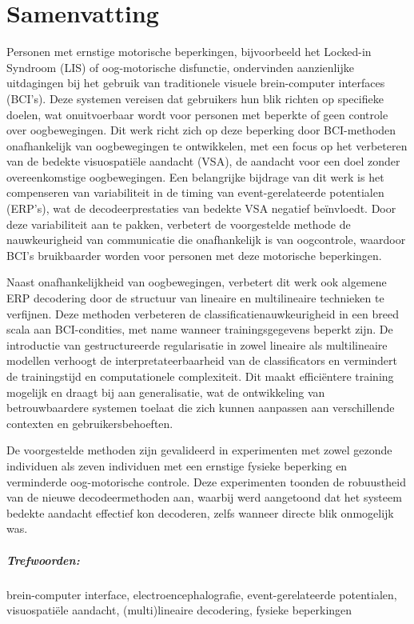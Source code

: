 \chapter*{Samenvatting}

Personen met ernstige motorische beperkingen, bijvoorbeeld het Locked-in
Syndroom (LIS) of oog-motorische disfunctie, ondervinden aanzienlijke
uitdagingen bij het gebruik van traditionele visuele brein-computer interfaces (BCI's).
Deze systemen vereisen dat gebruikers hun blik richten op specifieke doelen,
wat onuitvoerbaar wordt voor personen met beperkte of geen controle
over oogbewegingen.
Dit werk richt zich op deze beperking door BCI-methoden onafhankelijk van
oogbewegingen te ontwikkelen, met een focus op het verbeteren van de bedekte
visuospati\"ele aandacht (VSA), de  aandacht voor een doel zonder
overeenkomstige oogbewegingen.
Een belangrijke bijdrage van dit werk is het compenseren van variabiliteit in
de timing van event-gerelateerde potentialen (ERP's), wat de decodeerprestaties
van bedekte VSA negatief beïnvloedt.
Door deze variabiliteit aan te pakken, verbetert de voorgestelde methode de
nauwkeurigheid van communicatie die onafhankelijk is van oogcontrole,
waardoor BCI's bruikbaarder worden voor personen met deze motorische
beperkingen.

Naast onafhankelijkheid van oogbewegingen, verbetert dit werk ook algemene
ERP decodering door de structuur van lineaire en multilineaire technieken te verfijnen.
Deze methoden verbeteren de classificatienauwkeurigheid in een breed scala aan
BCI-condities, met name wanneer trainingsgegevens beperkt zijn.
De introductie van gestructureerde regularisatie in zowel lineaire als
multilineaire modellen verhoogt de interpretateerbaarheid van de classificators
en vermindert de trainingstijd en computationele complexiteit.
Dit maakt efficiëntere training mogelijk en draagt bij aan generalisatie, wat
de ontwikkeling van betrouwbaardere systemen toelaat die zich kunnen
aanpassen aan verschillende contexten en gebruikersbehoeften.

De voorgestelde methoden zijn gevalideerd in experimenten met zowel gezonde
individuen als zeven individuen met een ernstige fysieke beperking en verminderde
oog-motorische controle.
Deze experimenten toonden de robuustheid van de nieuwe decodeermethoden aan,
waarbij werd aangetoond dat het systeem bedekte aandacht effectief kon decoderen,
zelfs wanneer directe blik onmogelijk was.

\paragraph{Trefwoorden:}
brein-computer interface,
electroencephalografie,
event-gerelateerde potentialen,
visuospati\"ele aandacht,
(multi)lineaire decodering,
fysieke beperkingen
